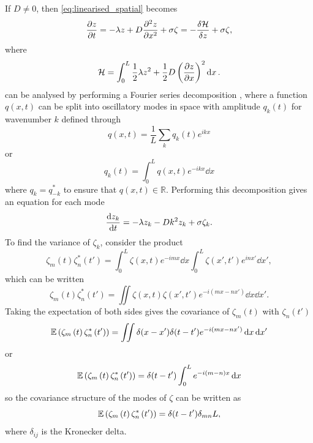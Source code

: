 If $D \neq 0$, then \cref{eq:linearised_spatial} becomes
\begin{equation}
  \label{eq:linearised_spatial_D}
  \pdv{z}{t} = -\lambda z + D \pdv[2]{z}{x} + \sigma\zeta = -\fdv{\mathcal{H}}{z} + \sigma \zeta,
\end{equation}
where
\begin{equation}
  \label{eq:linearised_energy}
  \mathcal{H} = \int_0^L \frac{1}{2}\lambda z^2 + \frac{1}{2}D\left(\pdv{z}{x}\right)^2 \dd{x}.
\end{equation}
 can be analysed by performing a Fourier series decomposition \parencite{riley2006}, where a function $q(x,t)$ can be split
into oscillatory modes in space with amplitude $q_k(t)$ for wavenumber $k$ defined through
\begin{equation}
  \label{eq:fourier}
  q(x,t) = \frac{1}{L} \sum_k q_k(t) e^{ikx}
\end{equation}
or
\begin{equation}
  \label{eq:fourier_inverse}
  q_k(t) = \int_0^L q(x,t) e^{-ikx} \dd{x}
\end{equation}
where $q_k = q_{-k}^*$ to ensure that $q(x,t) \in \mathbb{R}$.
Performing this decomposition gives an equation for each mode
\begin{equation}
  \label{eq:linearised_spatial_D_modes}
  \dv{z_k}{t} = -\lambda z_k - Dk^2 z_k + \sigma \zeta_k.
\end{equation}
To find the variance of $\zeta_k$, consider the product
\begin{equation}
  \label{eq:zeta_m_zeta_n}
  \zeta_m(t)\zeta_n^*(t') = \int_0^L \zeta(x,t) e^{-imx} \dd{x} \int_0^L \zeta(x',t') e^{inx'} \dd{x'}, 
\end{equation}
which can be written
\begin{equation}
  \label{eq:zeta_m_zeta_n_combined}
  \zeta_m(t)\zeta_n^*(t') = \iint \zeta(x,t)\zeta(x',t') e^{-i(mx-nx')} \dd{x}\dd{x'}.
\end{equation}
Taking the expectation of both sides gives the covariance of $\zeta_m(t)$ with $\zeta_n(t')$ 
\begin{equation}
  \label{eq:covariance_of_zeta_mode}
  \operatorname*{\mathbb{E}} \left(\zeta_m\left(t\right)\zeta_n^*\left(t'\right)\right) = \iint \delta(x-x')\delta(t-t')e^{-i(mx-nx')} \dd{x}\dd{x'} 
\end{equation}
or
\begin{equation}
  \label{eq:covariance_of_zeta_mode_delta}
  \operatorname*{\mathbb{E}} \left(\zeta_m\left(t\right)\zeta_n^*\left(t'\right)\right) = \delta(t-t') \int_0^L e^{-i(m-n)x} \dd{x}
\end{equation}
so the covariance structure of the modes of $\zeta$ can be written as
\begin{equation}
  \label{eq:covariance_structure_of_zeta_modes}
  \operatorname*{\mathbb{E}} \left(\zeta_m\left(t\right)\zeta_n^*\left(t'\right)\right) = \delta(t-t') \delta_{mn} L,
\end{equation}
where $\delta_{ij}$ is the Kronecker delta.

